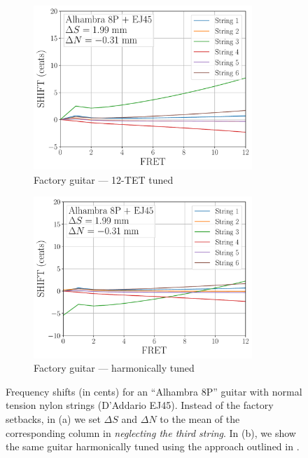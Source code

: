  \begin{figure}
  \centering
  \begin{subfigure}[b]{0.45\textwidth}
   \centering
   \includegraphics[width=3.25in]{figures/shift_alhambra8p_ej45_comp_x3}
   \caption{Factory guitar --- 12-TET tuned}
   \label{fig:shift_alhambra8p_ej45_comp_x3}
  \end{subfigure}
  \hspace{0.25in}
  \begin{subfigure}[b]{0.45\textwidth}
   \centering
   \includegraphics[width=3.25in]{figures/shift_alhambra8p_ej45_harm_x3}
   \caption{Factory guitar --- harmonically tuned}
   \label{fig:shift_alhambra8p_ej45_harm_x3}
  \end{subfigure}
  \caption{\label{fig:compensation_alhambra8p_ej45_x3} Frequency shifts (in cents) for an ``Alhambra 8P'' guitar with normal tension nylon strings (D'Addario EJ45). Instead of the factory setbacks, in (a) we set $\Delta S$ and $\Delta N$ to the mean of the corresponding column in  \emph{neglecting the third string}. In (b), we show the same guitar harmonically tuned using the approach outlined in .}
 \end{figure}
